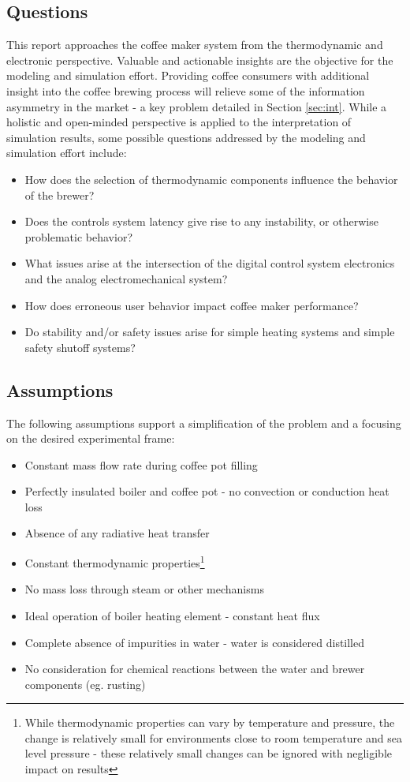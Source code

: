\documentclass[10pt]{article}
\begin{document}
\subsection{Questions}
This report approaches the coffee maker system from the thermodynamic and electronic perspective.  Valuable and actionable insights are the objective for the modeling and simulation effort.  Providing coffee consumers with additional insight into the coffee brewing process will relieve some of the information asymmetry in the market - a key problem detailed in Section \ref{sec:int}.  While a holistic and open-minded perspective is applied to the interpretation of simulation results, some possible questions addressed by the modeling and simulation effort include:
\begin{itemize}
\item How does the selection of thermodynamic components influence the behavior of the brewer?
\item Does the controls system latency give rise to any instability, or otherwise problematic behavior?
\item What issues arise at the intersection of the digital control system electronics and the analog electromechanical system?
\item How does erroneous user behavior impact coffee maker performance?
\item Do stability and/or safety issues arise for simple heating systems and simple safety shutoff systems?
\end{itemize}

\subsection{Assumptions}
\label{sec:ass}

The following assumptions support a simplification of the problem and a focusing on the desired experimental frame:
\begin{itemize}
\item Constant mass flow rate during coffee pot filling
\item Perfectly insulated boiler and coffee pot - no convection or conduction heat loss
\item Absence of any radiative heat transfer
\item Constant thermodynamic properties\footnote{While thermodynamic properties can vary by temperature and pressure, the change is relatively small for environments close to room temperature and sea level pressure - these relatively small changes can be ignored with negligible impact on results}
\item No mass loss through steam or other mechanisms
\item Ideal operation of boiler heating element - constant heat flux
\item Complete absence of impurities in water - water is considered distilled
\item No consideration for chemical reactions between the water and brewer components (eg. rusting)
\end{itemize}
\end{document}
